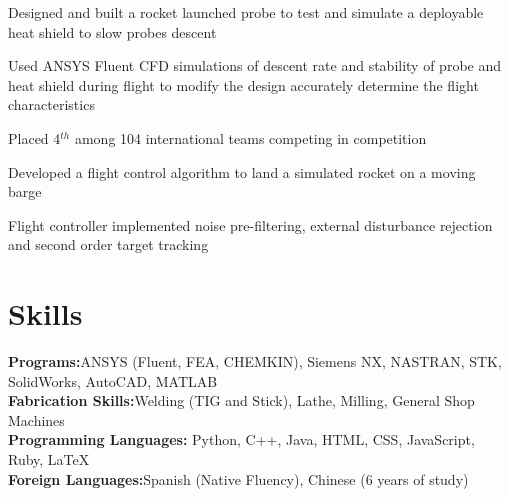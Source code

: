 \documentclass[letterpaper,11pt]{cv_format}
\begin{document}
\begin{c_itemize}
    \item Designed and built a rocket launched probe to test and simulate a deployable heat shield to slow probes descent 
    \item Used ANSYS Fluent CFD simulations of descent rate and stability of probe and heat shield during flight to modify the design accurately determine the flight characteristics
    \item Placed 4$^{th}$ among 104 international teams competing in competition
\end{c_itemize}

\begin{c_itemize}
    \item Developed a flight control algorithm to land a simulated rocket on a moving barge
    \item Flight controller implemented noise pre-filtering, external disturbance rejection and second order target tracking
\end{c_itemize}


\section{Skills}
\textbf{Programs:}ANSYS (Fluent, FEA, CHEMKIN), Siemens NX, NASTRAN, STK, SolidWorks, AutoCAD, MATLAB \\
\textbf{Fabrication Skills:}Welding (TIG and Stick), Lathe, Milling, General Shop Machines\\
\textbf{Programming Languages:} Python, C++, Java, HTML, CSS,  JavaScript, Ruby, \LaTeX\\
\textbf{Foreign Languages:}Spanish (Native Fluency), Chinese (6 years of study)

 
\end{document}
